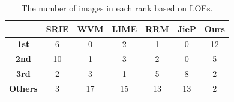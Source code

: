 \begin{table}[htbp]
	\begin{center} 
	\caption{The number of images in each rank based on LOEs.}
	\begin{tabular}{c||c|c|c|c|c|c} \hline
	\backslashbox{\bf{Rank}}{\bf{Method}} & {SRIE} & {WVM} & {LIME} & {RRM} & {JieP} & {Ours} \\ \hline \hline
	\textbf{1st} & 6 & 0 & 2 & 1 & 0 & 12  \\ \hline
	\textbf{2nd} & 10 & 1 & 3 & 2 & 0 & 5 \\ \hline
	\textbf{3rd} & 2 & 3 & 1 & 5 & 8 & 2 \\ \hline
	\textbf{Others} & 3 & 17 & 15 & 13 & 13 & 2 \\ \hline
	\end{tabular} \label{tab:loe}
	\end{center}
\end{table}
